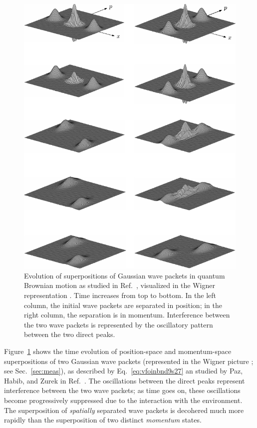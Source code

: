 \documentclass[3p,sort&compress]{elsarticle}
\begin{document}
\begin{figure}
\centering
\includegraphics[scale=1]{psdec.pdf}
\caption{Evolution of superpositions of Gaussian wave packets in quantum Brownian motion as studied in Ref.~\cite{Paz:1993:ta}, visualized in the Wigner representation \cite{Wigner:1932:un,Hillery:1984:tv}. Time increases from top to bottom. In the left column, the initial wave packets are separated in position; in the right column, the separation is in momentum. Interference between the two wave packets is represented by the oscillatory pattern between the two direct peaks.}
\label{fig:gaussmov}
\end{figure}

Figure~\ref{fig:gaussmov} shows the time evolution of position-space and momentum-space superpositions of two Gaussian wave
packets (represented in the Wigner picture \cite{Wigner:1932:un,Hillery:1984:tv}; see Sec.~\ref{sec:meas}), as described by Eq.~\eqref{eq:vfoinbnd9s27} an studied by Paz, Habib, and Zurek in Ref.~\cite{Paz:1993:ta}. The oscillations between the direct peaks represent interference between the two wave packets; as time goes on, these oscillations become progressively suppressed due to the interaction with the environment. The superposition of \emph{spatially} separated wave packets is decohered much more rapidly than the superposition of two distinct \emph{momentum} states. 
\end{document}
